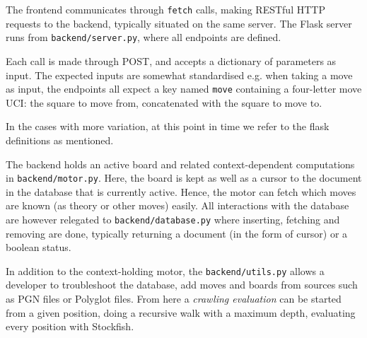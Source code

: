 \documentclass[architecture.tex]{subfiles}
\begin{document}
The frontend communicates through \lstinline{fetch} calls, making RESTful
HTTP requests to the backend, typically situated on the same server.
The Flask server runs from \lstinline{backend/server.py}, where all endpoints
are defined.

Each call is made through POST, and accepts a dictionary of parameters as input.
The expected inputs are somewhat standardised e.g. when taking a move as input,
the endpoints all expect a key named \lstinline{move} containing a four-letter
move UCI: the square to move from, concatenated with the square to move to.

In the cases with more variation, at this point in time we refer to the
flask definitions as mentioned.

The backend holds an active board and related context-dependent computations
in \lstinline{backend/motor.py}. Here, the board is kept as well as a cursor
to the document in the database that is currently active.
Hence, the motor can fetch which moves are known (as theory or other moves)
easily. All interactions with the database are however relegated to
\lstinline{backend/database.py} where inserting, fetching and removing
are done, typically returning a document (in the form of cursor) or a
boolean status.

In addition to the context-holding motor, the \lstinline{backend/utils.py}
allows a developer to troubleshoot the database, add moves and boards
from sources such as PGN files or Polyglot files.
From here a \textit{crawling evaluation} can be started from a given
position, doing a recursive walk with a maximum depth, evaluating
every position with Stockfish.
\end{document}
